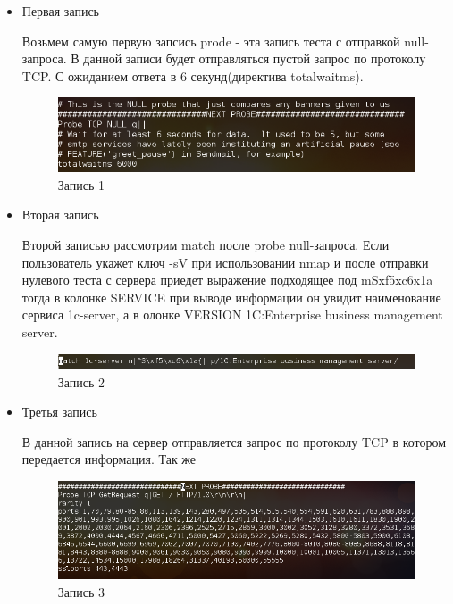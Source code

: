 \documentclass[11pt, a4paper]{article}		%
\begin{document}
\begin{itemize}
\item Первая запись

Возьмем самую первую запсись prode - эта запись теста с отправкой null-запроса. В данной записи будет отправляться пустой запрос по протоколу TCP. С ожиданием ответа в 6 секунд(директива totalwaitms).

\begin{figure}[h!]
\centering
\includegraphics[scale=0.75]{res/probe_1}
\caption{Запись 1}
\end{figure}

\item Вторая запись

Второй записью рассмотрим match после probe null-запроса. Если пользователь укажет ключ -sV при использовании nmap и после отправки нулевого теста с сервера приедет выражение подходящее под mSxf5xc6x1a тогда в колонке SERVICE при выводе информации он увидит наименование сервиса 1c-server, а в олонке VERSION 1C:Enterprise business management server.

\begin{figure}[h!]
\centering
\includegraphics[scale=0.75]{res/probe_2}
\caption{Запись 2}
\end{figure}

\item Третья запись

В данной запись на сервер отправляется запрос по протоколу TCP в котором передается информация. Так же 



\begin{figure}[h!]
\centering
\includegraphics[scale=0.75]{res/probe_3}
\caption{Запись 3}
\end{figure}



\end{itemize}
\end{document}
